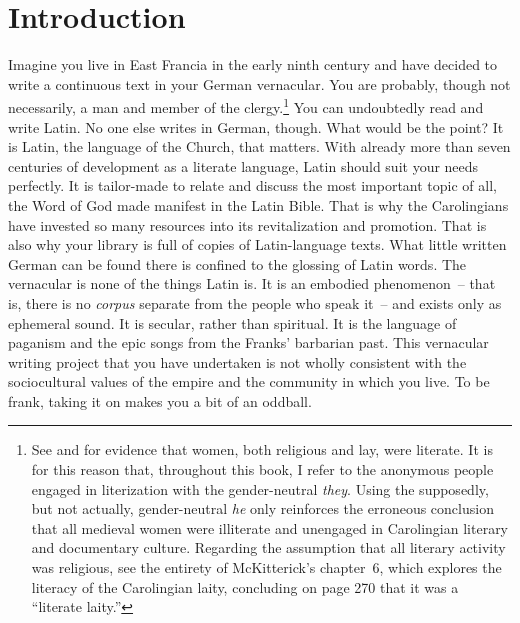 \chapter{Introduction}\label{sec:chap:1}

Imagine you live in East Francia in the early ninth century and have decided to write a continuous text in your German vernacular. You are probably, though not necessarily, a man and member of the clergy.\footnote{See \citet[124--138]{Garver2009} and \citet[223--227]{McKitterick1989} for evidence that women, both religious and lay, were literate. It is for this reason that, throughout this book, I refer to the anonymous people engaged in literization with the gender-neutral \textit{they}. Using the supposedly, but not actually, gender\hyp neutral \textit{he} only reinforces the erroneous conclusion that all medieval women were illiterate and unengaged in Carolingian literary and documentary culture. Regarding the assumption that all literary activity was religious, see the entirety of McKitterick’s chapter~6, which explores the literacy of the Carolingian laity, concluding on page 270 that it was a “literate laity.”} You can undoubtedly read and write Latin. No one else writes in German, though. What would be the point? It is Latin, the language of the Church, that matters. With already more than seven centuries of development as a literate language, Latin should suit your needs perfectly. It is tailor-made to relate and discuss the most important topic of all, the Word of God made manifest in the Latin Bible. That is why the Carolingians have invested so many resources into its revitalization and promotion. That is also why your library is full of copies of Latin-language texts. What little written German can be found there is confined to the glossing of Latin words. The vernacular is none of the things Latin is. It is an embodied phenomenon~-- that is, there is no \textit{corpus} separate from the people who speak it~-- and exists only as ephemeral sound. It is secular, rather than spiritual. It is the language of paganism and the epic songs from the Franks’ barbarian past. This vernacular writing project that you have undertaken is not wholly consistent with the sociocultural values of the empire and the community in which you live. To be frank, taking it on makes you a bit of an oddball.

